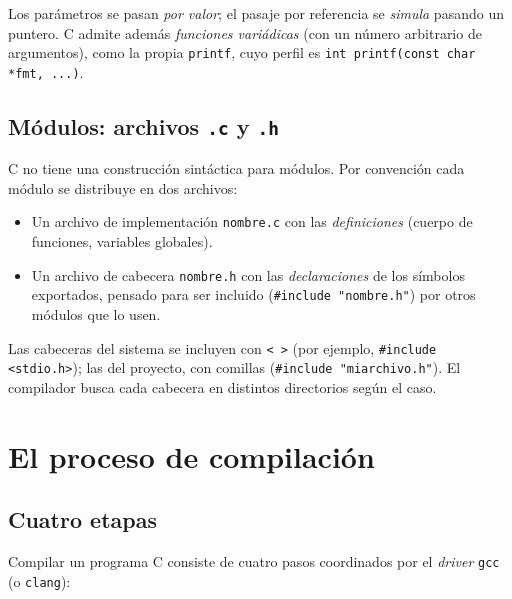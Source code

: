 \documentclass[11pt,a4paper]{article}
\begin{document}
Los parámetros se pasan \emph{por valor}; el pasaje por referencia se
\emph{simula} pasando un puntero. C admite además \emph{funciones
variádicas} (con un número arbitrario de argumentos), como la propia
\texttt{printf}, cuyo perfil es
\texttt{int printf(const char *fmt, ...)}.

\subsection{Módulos: archivos \texttt{.c} y \texttt{.h}}

C no tiene una construcción sintáctica para módulos. Por convención
cada módulo se distribuye en dos archivos:

\begin{itemize}[leftmargin=*]
    \item Un archivo de implementación \texttt{nombre.c} con las
        \emph{definiciones} (cuerpo de funciones, variables globales).
    \item Un archivo de cabecera \texttt{nombre.h} con las
        \emph{declaraciones} de los símbolos exportados, pensado para
        ser incluido (\texttt{\#include "nombre.h"}) por otros
        módulos que lo usen.
\end{itemize}

Las cabeceras del sistema se incluyen con \texttt{<\,>} (por ejemplo,
\texttt{\#include <stdio.h>}); las del proyecto, con comillas
(\texttt{\#include "miarchivo.h"}). El compilador busca cada cabecera
en distintos directorios según el caso.

\section{El proceso de compilación}

\subsection{Cuatro etapas}

Compilar un programa C consiste de cuatro pasos coordinados por el
\emph{driver} \texttt{gcc} (o \texttt{clang}):
\end{document}
